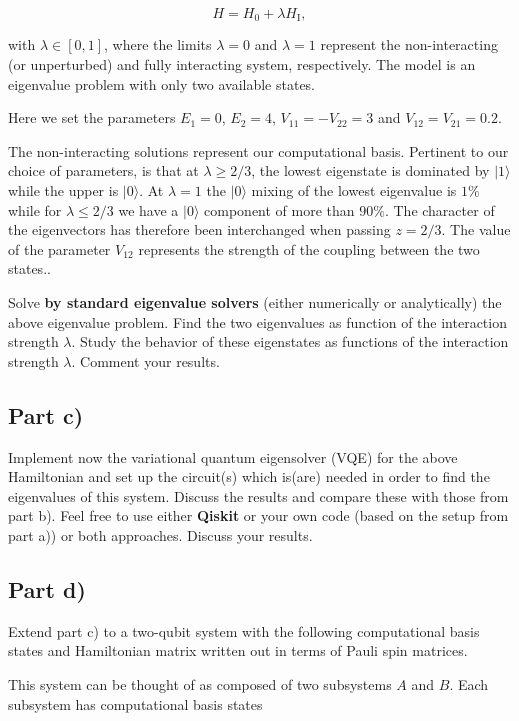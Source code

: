 \documentclass[%
oneside,                 %
final,                   %
10pt]{article}
\begin{document}
\[
H=H_0+\lambda H_\mathrm{I},
\]

with $\lambda \in [0,1]$, where the limits $\lambda=0$ and $\lambda=1$
represent the non-interacting (or unperturbed) and fully interacting
system, respectively.  The model is an eigenvalue problem with only
two available states.

Here we set the parameters $E_1=0$,
$E_2=4$, $V_{11}=-V_{22}=3$ and $V_{12}=V_{21}=0.2$.

The non-interacting solutions represent our computational basis.
Pertinent to our choice of parameters, is that at $\lambda\geq 2/3$,
the lowest eigenstate is dominated by $\vert 1\rangle$ while the upper
is $\vert 0 \rangle$. At $\lambda=1$ the $\vert 0 \rangle$ mixing of
the lowest eigenvalue is $1\%$ while for $\lambda\leq 2/3$ we have a
$\vert 0 \rangle$ component of more than $90\%$.  The character of the
eigenvectors has therefore been interchanged when passing $z=2/3$. The
value of the parameter $V_{12}$ represents the strength of the coupling
between the two states..

Solve \textbf{by standard eigenvalue solvers} (either numerically or analytically) the above eigenvalue problem.
Find the two eigenvalues as function of the interaction strength $\lambda$.
Study the behavior of these eigenstates as functions of the interaction strength $\lambda$.
Comment your results.

\subsection*{Part c)}

Implement now the variational quantum eigensolver (VQE) for the above
Hamiltonian and set up the circuit(s) which is(are) needed in order to find
the eigenvalues of this system. Discuss the results and compare these
with those from part b). Feel free to use either \textbf{Qiskit} or your own
code (based on the setup from part a)) or both approaches. Discuss
your results.

\subsection*{Part d)}

Extend part c) to a two-qubit system with the following computational
basis states and Hamiltonian matrix written out in terms of Pauli spin
matrices.

This system can be thought of as composed of two subsystems
$A$ and $B$. Each subsystem has computational basis states
\end{document}
